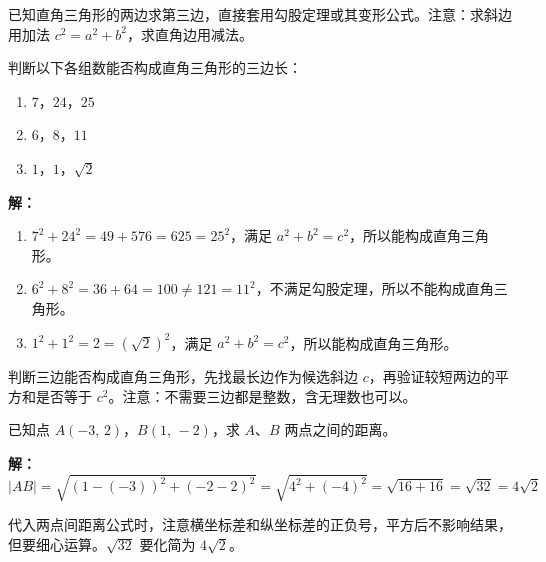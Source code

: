 \documentclass[12pt, a4paper]{ctexart}
\begin{document}
\begin{tipbox}[方法总结]
已知直角三角形的两边求第三边，直接套用勾股定理或其变形公式。注意：求斜边用加法 $c^2=a^2+b^2$，求直角边用减法。
\end{tipbox}

\vspace{6pt}

\begin{examplebox}[【例题2】利用逆定理判断三角形形状]
判断以下各组数能否构成直角三角形的三边长：
\begin{enumerate}[label=(\arabic*)]
  \item $7$，$24$，$25$
  \item $6$，$8$，$11$
  \item $1$，$1$，$\sqrt{2}$
\end{enumerate}
\end{examplebox}

\textbf{解：}
\begin{enumerate}[label=(\arabic*)]
  \item $7^2 + 24^2 = 49 + 576 = 625 = 25^2$，满足 $a^2+b^2=c^2$，所以能构成直角三角形。
  \item $6^2 + 8^2 = 36 + 64 = 100 \neq 121 = 11^2$，不满足勾股定理，所以不能构成直角三角形。
  \item $1^2 + 1^2 = 2 = (\sqrt{2})^2$，满足 $a^2+b^2=c^2$，所以能构成直角三角形。
\end{enumerate}

\begin{tipbox}[方法总结]
判断三边能否构成直角三角形，先找最长边作为候选斜边 $c$，再验证较短两边的平方和是否等于 $c^2$。注意：不需要三边都是整数，含无理数也可以。
\end{tipbox}

\vspace{6pt}

\begin{examplebox}[【例题3】勾股定理在坐标系中的应用]
已知点 $A(-3,\, 2)$，$B(1,\, -2)$，求 $A$、$B$ 两点之间的距离。
\end{examplebox}

\textbf{解：}
\[
|AB| = \sqrt{(1-(-3))^2 + (-2-2)^2} = \sqrt{4^2 + (-4)^2} = \sqrt{16+16} = \sqrt{32} = 4\sqrt{2}
\]

\begin{tipbox}[方法总结]
代入两点间距离公式时，注意横坐标差和纵坐标差的正负号，平方后不影响结果，但要细心运算。$\sqrt{32}$ 要化简为 $4\sqrt{2}$。
\end{tipbox}

\vspace{6pt}
\end{document}
